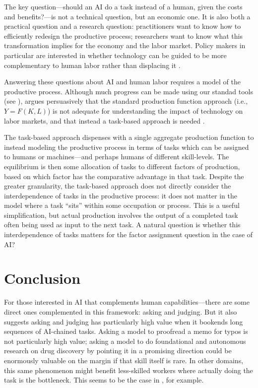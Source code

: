 \documentclass{article}
\theoremstyle{plain}
\theoremstyle{plain}
\begin{document}
The key question---should an AI do a task instead of a human, given the costs and benefits?---is not a technical question, but an economic one.
It is also both a practical question and a research question: practitioners want to know how to efficiently redesign the productive process; researchers want to know what this transformation implies for the economy and the labor market.
Policy makers in particular are interested in whether technology can be guided to be more complementary to human labor rather than displacing it \citep{acemoglu2018automation}.

Answering these questions about AI and human labor requires a model of the productive process.
Although much progress can be made using our standad tools (see \citep{korinek2018artificial}), \cite{acemoglu2024task} argues persuasively that the standard production function approach (i.e., $Y = F(K, L)$) is not adequate for understanding the impact of technology on labor markets, and that instead a task-based approach is needed \citep{aghion2024ai}.

The task-based approach dispenses with a single aggregate production function to instead modeling the productive process in terms of tasks which can be assigned to humans or machines---and perhaps humans of different skill-levels.
The equilibrium is then some allocation of tasks to different factors of production, based on which factor has the comparative advantage in that task.
Despite the greater granularity, the task-based approach does not directly consider the interdependence of tasks in the productive process: it does not matter in the model where a task ``sits'' within some occupation or process. 
This is a useful simplification, but actual production involves the output of a completed task often being used as input to the next task.
A natural question is whether this interdependence of tasks matters for the factor assignment question in the case of AI? 



\section{Conclusion}

For those interested in AI that complements human capabilities---there are some direct ones complemented in this framework: asking and judging.
But it also suggests asking and judging has particularly high value when it bookends long sequences of AI-chained tasks.
Asking a model to proofread a memo for typos is not particularly high value;
asking a model to do foundational and autonomous research on drug discovery by pointing it in a promising direction could be enormously valuable on the margin if that skill itself is rare.
In other domains, this same phenomenon might benefit less-skilled workers where actually doing the task is the bottleneck.
This seems to be the case in \cite{brynjolfsson2023generative}, for example.
  
\end{document}
